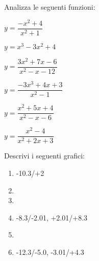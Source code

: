 \begin{esercizio}\label{ese:stufun.4e}
Analizza le seguenti funzioni:
\begin{multicols}{3}
 \begin{enumeratea}
  \item \(y = \dfrac{-x^2 +4}{x^2 +1}\) \\ [.5em] %
  \item \(y = x^3 -3x^2 +4\) %
  \item \(y = \dfrac{3x^2 +7x -6}{x^2 -x -12}\) \\ %
  \item \(y = \dfrac{-3x^3 +4x +3}{x^2 -1}\) %
  \item \(y = \dfrac{x^2+5x+4}{x^2-x-6}\) \\ %
  \item \(y = \dfrac{x^2 -4}{x^2 +2x +3}\) %
 \end{enumeratea}
\end{multicols}
\end{esercizio}

\bigskip

\bigskip

\begin{esercizio}\label{ese:stufun.4g}
Descrivi i seguenti grafici:
\begin{multicols}{2}
 \begin{enumerate} [left=0pt, label=\alph*)]
  \item \myp 
{}
{-10.3/+2} %
  \item \myp 
{} %
  \item \myp 
{}%
\vspace{1mm}
  \item \myp 
{}
{-8.3/-2.01, +2.01/+8.3} %
  \item \myp 
{} %
\item \myp 
{}
{-12.3/-5.0, -3.01/+4.3} %
 \end{enumerate}
\end{multicols}
\end{esercizio}

